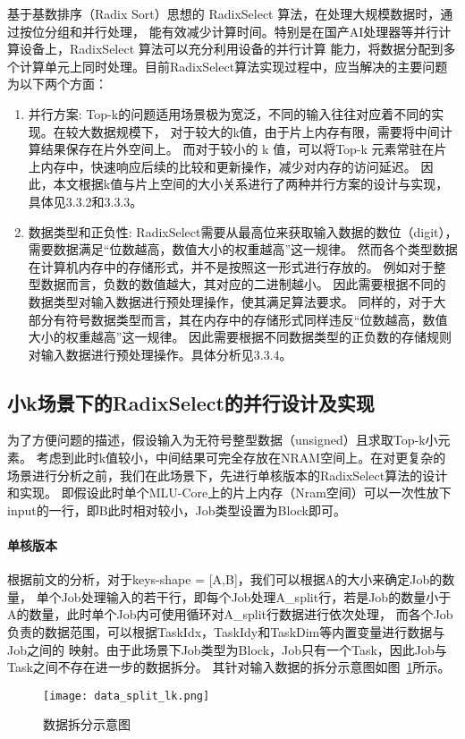 基于基数排序（Radix Sort）思想的 RadixSelect 算法，在处理大规模数据时，通过按位分组和并行处理，
能有效减少计算时间。特别是在国产AI处理器等并行计算设备上，RadixSelect 算法可以充分利用设备的并行计算
能力，将数据分配到多个计算单元上同时处理。目前RadixSelect算法实现过程中，应当解决的主要问题为以下两个方面：
\begin{enumerate}
    
    \item{并行方案}:
    Top-k的问题适用场景极为宽泛，不同的输入往往对应着不同的实现。在较大数据规模下，
    对于较大的k值，由于片上内存有限，需要将中间计算结果保存在片外空间上。
    而对于较小的 k 值，可以将Top-k 元素常驻在片上内存中，快速响应后续的比较和更新操作，减少对内存的访问延迟。
    因此，本文根据k值与片上空间的大小关系进行了两种并行方案的设计与实现，具体见3.3.2和3.3.3。

    \item{数据类型和正负性}:
    RadixSelect需要从最高位来获取输入数据的数位（digit），需要数据满足“位数越高，数值大小的权重越高”这一规律。
    然而各个类型数据在计算机内存中的存储形式，并不是按照这一形式进行存放的。
    例如对于整型数据而言，负数的数值越大，其对应的二进制越小。
    因此需要根据不同的数据类型对输入数据进行预处理操作，使其满足算法要求。
    同样的，对于大部分有符号数据类型而言，其在内存中的存储形式同样违反“位数越高，数值大小的权重越高”这一规律。
    因此需要根据不同数据类型的正负数的存储规则对输入数据进行预处理操作。具体分析见3.3.4。

\end{enumerate}

\subsection{小k场景下的RadixSelect的并行设计及实现}
为了方便问题的描述，假设输入为无符号整型数据（unsigned）且求取Top-k小元素。
考虑到此时k值较小，中间结果可完全存放在NRAM空间上。在对更复杂的场景进行分析之前，我们在此场景下，先进行单核版本的RadixSelect算法的设计和实现。
即假设此时单个MLU-Core上的片上内存（Nram空间）可以一次性放下input的一行，即B此时相对较小，Job类型设置为Block即可。
  


  
  \paragraph{单核版本}
  根据前文的分析，对于keys-shape = [A,B]，我们可以根据A的大小来确定Job的数量，
  单个Job处理输入的若干行，即每个Job处理A\_split行，若是Job的数量小于A的数量，此时单个Job内可使用循环对A\_split行数据进行依次处理，
  而各个Job负责的数据范围，可以根据TaskIdx，TaskIdy和TaskDim等内置变量进行数据与Job之间的
  映射。由于此场景下Job类型为Block，Job只有一个Task，因此Job与Task之间不存在进一步的数据拆分。
  其针对输入数据的拆分示意图如图~\ref{fig:data_split_lk}所示。
  \begin{figure}[ht]
    \centering
    \texttt{[image: data\_split\_lk.png]}
    \caption{数据拆分示意图}
    \label{fig:data_split_lk}
\end{figure}

